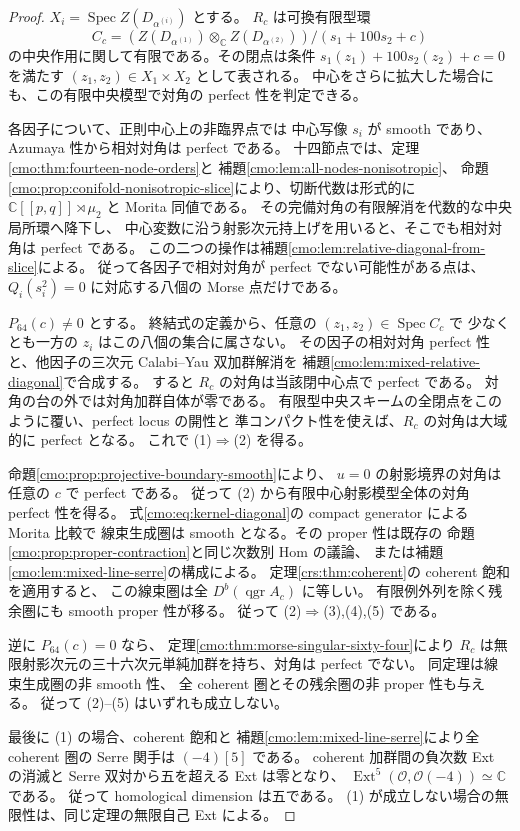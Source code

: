 \begin{proof}
$X_i=\operatorname{Spec}Z(D_{\alpha^{(i)}})$ とする。
$R_c$ は可換有限型環
\[
 C_c=(Z(D_{\alpha^{(1)}})\otimes_{\mathbb C}Z(D_{\alpha^{(2)}}))
          /(s_1+100s_2+c)
\]
の中央作用に関して有限である。その閉点は条件 $s_1(z_1)+100s_2(z_2)+c=0$ を満たす
$(z_1,z_2)\in X_1\times X_2$ として表される。
中心をさらに拡大した場合にも、この有限中央模型で対角の perfect 性を判定できる。

各因子について、正則中心上の非臨界点では
中心写像 $s_i$ が smooth であり、Azumaya 性から相対対角は perfect である。
十四節点では、定理\ref{cmo:thm:fourteen-node-orders}と
補題\ref{cmo:lem:all-nodes-nonisotropic}、
命題\ref{cmo:prop:conifold-nonisotropic-slice}により、切断代数は形式的に
$\mathbb C[[p,q]]\rtimes\mu_2$ と Morita 同値である。
その完備対角の有限解消を代数的な中央局所環へ降下し、
中心変数に沿う射影次元持上げを用いると、そこでも相対対角は perfect である。
この二つの操作は補題\ref{cmo:lem:relative-diagonal-from-slice}による。
従って各因子で相対対角が perfect でない可能性がある点は、
$Q_i(s_i^2)=0$ に対応する八個の Morse 点だけである。

$P_{64}(c)\ne0$ とする。
終結式の定義から、任意の $(z_1,z_2)\in\operatorname{Spec}C_c$ で
少なくとも一方の $z_i$ はこの八個の集合に属さない。
その因子の相対対角 perfect 性と、他因子の三次元 Calabi--Yau 双加群解消を
補題\ref{cmo:lem:mixed-relative-diagonal}で合成する。
すると $R_c$ の対角は当該閉中心点で perfect である。
対角の台の外では対角加群自体が零である。
有限型中央スキームの全閉点をこのように覆い、perfect locus の開性と
準コンパクト性を使えば、$R_c$ の対角は大域的に perfect となる。
これで (1)$\Rightarrow$(2) を得る。

命題\ref{cmo:prop:projective-boundary-smooth}により、
$u=0$ の射影境界の対角は任意の $c$ で perfect である。
従って (2) から有限中心射影模型全体の対角 perfect 性を得る。
式\eqref{cmo:eq:kernel-diagonal}の compact generator による Morita 比較で
線束生成圏は smooth となる。その proper 性は既存の
命題\ref{cmo:prop:proper-contraction}と同じ次数別 Hom の議論、
または補題\ref{cmo:lem:mixed-line-serre}の構成による。
定理\ref{crs:thm:coherent}の coherent 飽和を適用すると、
この線束圏は全 $D^b(\operatorname{qgr}A_c)$ に等しい。
有限例外列を除く残余圏にも smooth proper 性が移る。
従って (2)$\Rightarrow$(3),(4),(5) である。

逆に $P_{64}(c)=0$ なら、
定理\ref{cmo:thm:morse-singular-sixty-four}により
$R_c$ は無限射影次元の三十六次元単純加群を持ち、対角は perfect でない。
同定理は線束生成圏の非 smooth 性、
全 coherent 圏とその残余圏の非 proper 性も与える。
従って (2)--(5) はいずれも成立しない。

最後に (1) の場合、coherent 飽和と
補題\ref{cmo:lem:mixed-line-serre}により全 coherent 圏の Serre 関手は
$(-4)[5]$ である。
coherent 加群間の負次数 Ext の消滅と Serre 双対から五を超える Ext は零となり、
$\operatorname{Ext}^5(\mathcal O,\mathcal O(-4))\simeq\mathbb C$ である。
従って homological dimension は五である。
(1) が成立しない場合の無限性は、同じ定理の無限自己 Ext による。
\end{proof}

